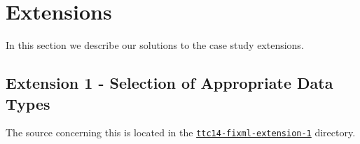 
\section{Extensions}
\label{sec:Extensions}

In this section we describe our solutions to the case study extensions.

\subsection{Extension 1 - Selection of Appropriate Data Types}
\label{sec:Extension1}

The source concerning this is located in the \href{https://github.com/fikovnik/ttc14-fixml-sigma/tree/master/ttc14-fixml-extension-1}{\texttt{ttc14-fixml-extension-1}} directory.

\bigskip

